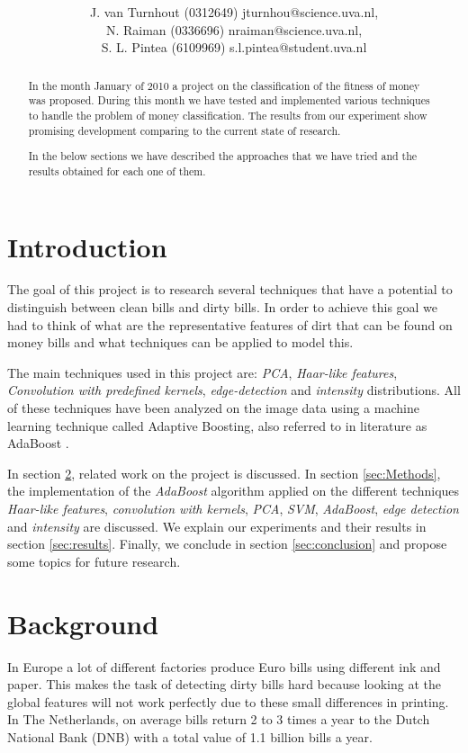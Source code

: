 \documentclass[11pt,twocolumn]{article}
\title{\tbf{Dirty Money:}\\\tbf{Feature selection using AdaBoost}}
\author{J. van Turnhout (0312649) jturnhou@science.uva.nl, 
	 \\ N. Raiman (0336696) nraiman@science.uva.nl, 
	 \\ S. L. Pintea (6109969) s.l.pintea@student.uva.nl}
\begin{document}
	\maketitle
	
	\begin{abstract}
		In the month January of 2010 a project on the classification of
		the fitness of money was proposed. During this month we have tested and
		implemented various techniques to handle the problem of money classification.
		The results from our experiment show promising development comparing to the
		current state of research.
		
		In the below sections we have described the approaches that we
		have tried and the results obtained for each one of them.
	\end{abstract}
	
	\section{Introduction}
		The goal of this project is to research several techniques that have a potential to distinguish between clean bills and dirty bills. In order to achieve this goal we had to think of what are the representative features of dirt that can be found on money bills and what techniques can be applied to model this.
		 		
		The main techniques used in this project are: \emph{PCA}, \emph{Haar-like features}, \emph{Convolution with predefined kernels}, \emph{edge-detection} and \emph{intensity} distributions. All of these techniques have been analyzed on the image data using a machine learning technique called Adaptive Boosting, also referred to in literature as AdaBoost \cite{Ada}.
		
		In section \ref{sec:Background}, related work on the project is discussed. In section \ref{sec:Methods}, the implementation of the \emph{AdaBoost} algorithm applied on the different techniques \emph{Haar-like features}, \emph{convolution with kernels}, \emph{PCA}, \emph{SVM}, \emph{AdaBoost}, \emph{edge detection} and \emph{intensity} are discussed. We explain our experiments and their results in section \ref{sec:results}. Finally, we conclude in section \ref{sec:conclusion} and propose some topics for future research.
	\section{Background}\label{sec:Background}
		In Europe a lot of different factories produce Euro bills using different ink and paper. This makes the task of detecting dirty bills hard because looking at the global features will not work perfectly due to these small differences in printing. In The Netherlands, on average bills return 2 to 3 times a year to the Dutch National Bank (DNB) with a total value of 1.1 billion bills a year. 
\end{document}

